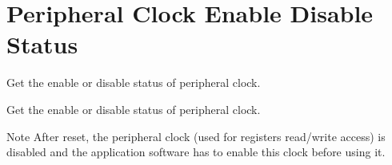 \hypertarget{group___r_c_c_ex___peripheral___clock___enable___disable___status}{\section{Peripheral Clock Enable Disable Status}
\label{group___r_c_c_ex___peripheral___clock___enable___disable___status}
}


Get the enable or disable status of peripheral clock.  


Get the enable or disable status of peripheral clock. \begin{DoxyNote}{Note}
After reset, the peripheral clock (used for registers read/write access) is disabled and the application software has to enable this clock before using it. 
\end{DoxyNote}
